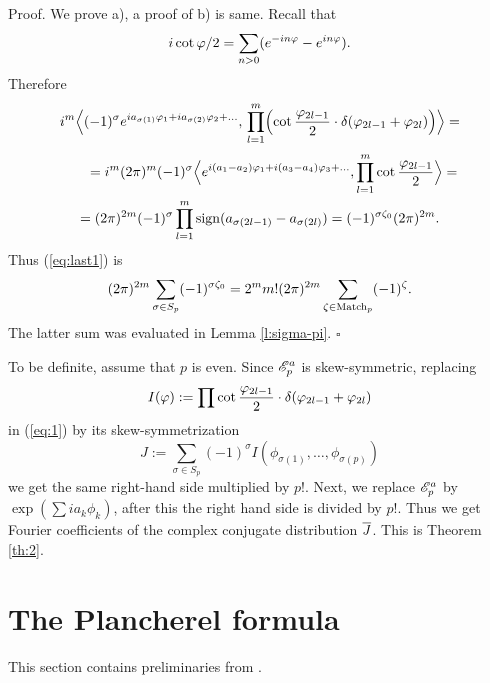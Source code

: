 \documentclass{article}
\newcounter{sec}
\def\sm{\smallskip}
\newcounter{punct}[sec]
\def\COUNTERS{\addtocounter{sec}{1}
              \setcounter{punct}{0}
          \setcounter{equation}{0}
          \setcounter{theorem}{0}
                  }
\begin{document}
{\sc Proof.}
We prove a), a proof of b) is  same.
Recall that
$$
i\cot \varphi/2=\sum_{n>0}(e^{-in\varphi} -e^{in\varphi} ).
$$
Therefore
\begin{equation}
i^m \Bigl\langle (-1)^\sigma e^{i a_{\sigma(1)}\varphi_1+i a_{\sigma(2)}\varphi_2+\dots  },\,
\prod_{l=1}^m
\Bigl(\cot\frac {\varphi_{2l-1}}2\cdot \delta(\varphi_{2l-1}+\varphi_{2l})\Bigr)
\Bigr\rangle =
\label{eq:predlast}
\end{equation}
\begin{multline}
\qquad
=
i^m (2\pi)^m
(-1)^\sigma 
\Bigl\langle
e^{i(a_1-a_2)\varphi_1+i(a_3-a_4)\varphi_3+\dots}, \prod_{l=1}^m \cot\frac {\varphi_{2l-1}}2
\Bigr\rangle
=\\
= (2\pi)^{2m} (-1)^\sigma  \prod_{l=1}^m \mathop {\mathrm {sign}}\nolimits (a_{\sigma(2l-1)}-a_{\sigma(2l)})
= (-1)^{\sigma\zeta_0} (2\pi)^{2m}
.
\label{eq:last1}
\end{multline}
Thus (\ref{eq:last1}) is
$$
(2\pi)^{2m}
\sum_{\sigma\in S _p} (-1)^{\sigma \zeta_0}=2^m m! (2\pi)^{2m} \sum_{\zeta\in \mathrm {Match}_p} (-1)^{\zeta}
.
$$
The latter sum was evaluated in Lemma \ref{l:sigma-pi}.
\hfill $\square$

\sm


To be definite, assume that $p$ is even.
Since $\mathcal{E}^a_p$ is skew-symmetric, replacing  
$$I(\varphi):=\prod
 \cot\frac {\varphi_{2l-1}}2\cdot \delta(\varphi_{2l-1}+\varphi_{2l})$$
 in (\ref{eq:1})
 by its skew-symmetrization 
 $$
 J:=\sum_{\sigma\in S_p} (-1)^\sigma I(\phi_{\sigma(1)},\dots, \phi_{\sigma(p)})
 $$
 we get the same right-hand side
 multiplied by $p!$. Next, we replace $\mathcal{E}^a_p$ by $\exp(\sum i a_k\phi_k)$,
 after this the right hand side is divided by $p!$. Thus we get Fourier coefficients of
 the complex conjugate distribution $\overline J$.
This is
Theorem \ref{th:2}.


\section{The Plancherel formula}

\COUNTERS

This section contains preliminaries from  \cite{San}.

\sm
\end{document}
